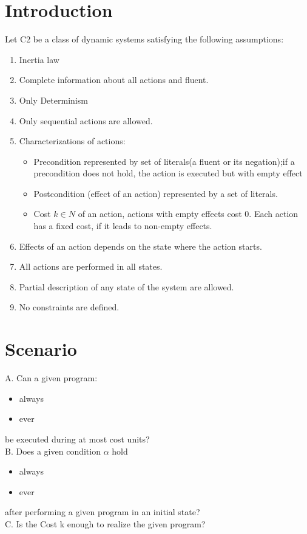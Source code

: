 \documentclass[11pt]{article}
\begin{document}
	\section{Introduction}\label{sec:intro}
	Let C2 be a class of dynamic systems satisfying the following assumptions:
	\begin{enumerate}
		\item Inertia law
		\item Complete information about all actions and fluent. 
		\item Only Determinism
		\item Only sequential actions are allowed.
		\item Characterizations of actions:\begin{itemize}
			\item Precondition represented by set of literals(a fluent or its negation);if a precondition does not hold, the action is executed but with empty effect
			\item Postcondition (effect of an action) represented by a set of literals.
			\item Cost $k \in N $ of an action, actions with empty effects cost 0. Each action has a fixed cost, if it leads to non-empty effects. 
		\end{itemize}
		\item Effects of an action depends on the state where the action starts.
		\item All actions are performed in all states.
		\item Partial description of any state of the system are allowed.
		\item No constraints are defined.	 
	\end{enumerate}
	\section{Scenario}\label{sec:scenario}
	A. Can a given program:
	\begin{itemize}
		\item always
		\item ever
	\end{itemize} 
	be executed during at most cost units? \\
	B. Does a given condition \(\alpha\) hold 
	\begin{itemize}
		\item always
		\item ever
	\end{itemize}
	after performing a given program in an initial state?\\ 
	C. Is the Cost k enough to realize the given program?
\end{document}
